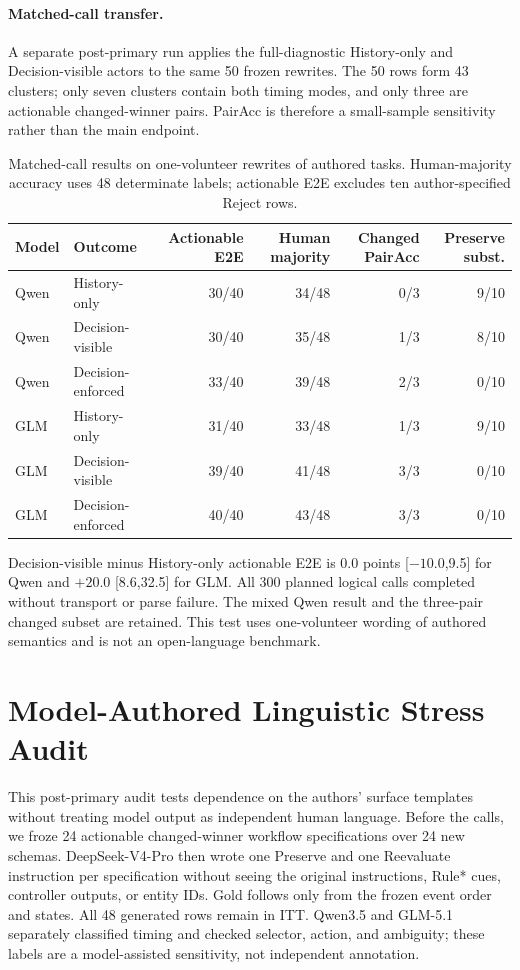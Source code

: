 \documentclass[10pt]{article}
\begin{document}
\paragraph{Matched-call transfer.}
A separate post-primary run applies the full-diagnostic History-only and Decision-visible actors to
the same 50 frozen rewrites. The 50 rows form 43 clusters; only seven clusters contain both timing
modes, and only three are actionable changed-winner pairs. PairAcc is therefore a small-sample
sensitivity rather than the main endpoint.
\begin{table}[H]
\centering
\small
\begin{tabular}{llrrrr}
\toprule
Model & Outcome & Actionable E2E & Human majority & Changed PairAcc & Preserve subst. \\
\midrule
Qwen & History-only & 30/40 & 34/48 & 0/3 & 9/10 \\
Qwen & Decision-visible & 30/40 & 35/48 & 1/3 & 8/10 \\
Qwen & Decision-enforced & 33/40 & 39/48 & 2/3 & 0/10 \\
GLM & History-only & 31/40 & 33/48 & 1/3 & 9/10 \\
GLM & Decision-visible & 39/40 & 41/48 & 3/3 & 0/10 \\
GLM & Decision-enforced & 40/40 & 43/48 & 3/3 & 0/10 \\
\bottomrule
\end{tabular}
\caption{Matched-call results on one-volunteer rewrites of authored tasks. Human-majority
accuracy uses 48 determinate labels; actionable E2E excludes ten author-specified Reject rows.}
\label{tab:supp-human-rewrite-matched}
\end{table}
Decision-visible minus History-only actionable E2E is 0.0 points [$-10.0$,9.5] for Qwen and
$+20.0$ [8.6,32.5] for GLM. All 300 planned logical calls completed without transport or
parse failure. The mixed Qwen result and the three-pair changed subset are retained. This test uses
one-volunteer wording of authored semantics and is not an open-language benchmark.

\section{Model-Authored Linguistic Stress Audit}
This post-primary audit tests dependence on the authors' surface templates without treating model
output as independent human language. Before the calls, we froze 24 actionable changed-winner workflow
specifications over 24 new schemas. DeepSeek-V4-Pro then wrote one Preserve and one Reevaluate
instruction per specification without seeing the original instructions, Rule* cues, controller
outputs, or entity IDs. Gold follows only from the frozen event order and states. All 48 generated
rows remain in ITT. Qwen3.5 and GLM-5.1 separately classified timing and checked selector, action,
and ambiguity; these labels are a model-assisted sensitivity, not independent annotation.
\end{document}
